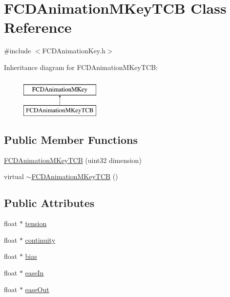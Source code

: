 \hypertarget{classFCDAnimationMKeyTCB}{
\section{FCDAnimationMKeyTCB Class Reference}
\label{classFCDAnimationMKeyTCB}
}


{\ttfamily \#include $<$FCDAnimationKey.h$>$}

Inheritance diagram for FCDAnimationMKeyTCB:\begin{figure}[H]
\begin{center}
\leavevmode
\includegraphics[height=2.000000cm]{classFCDAnimationMKeyTCB}
\end{center}
\end{figure}
\subsection*{Public Member Functions}
\begin{DoxyCompactItemize}
\item 
\hyperlink{classFCDAnimationMKeyTCB_aeeee3d548cbe6c41cd9a46ff0079d05d}{FCDAnimationMKeyTCB} (uint32 dimension)
\item 
virtual \hyperlink{classFCDAnimationMKeyTCB_a515f7219e82e55db7a7d543c624207c2}{$\sim$FCDAnimationMKeyTCB} ()
\end{DoxyCompactItemize}
\subsection*{Public Attributes}
\begin{DoxyCompactItemize}
\item 
float $\ast$ \hyperlink{classFCDAnimationMKeyTCB_a05aa82c6e377a34c8d4c521f05739070}{tension}
\item 
float $\ast$ \hyperlink{classFCDAnimationMKeyTCB_aad952e9ad96796b79ffbd7ea15fa4ce7}{continuity}
\item 
float $\ast$ \hyperlink{classFCDAnimationMKeyTCB_ae3812b7c36b879e9fd9ecfe67120c219}{bias}
\item 
float $\ast$ \hyperlink{classFCDAnimationMKeyTCB_a7e35030931711b58ae099eee73d05102}{easeIn}
\item 
float $\ast$ \hyperlink{classFCDAnimationMKeyTCB_a9cea41d40b917bc3f5151320318c49fe}{easeOut}
\end{DoxyCompactItemize}


